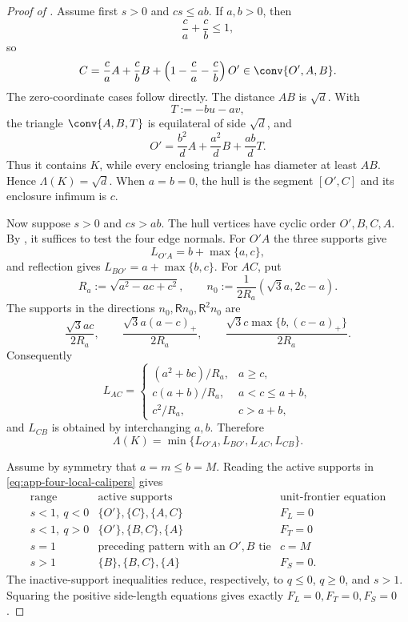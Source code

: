 \begin{proof}[Proof of ]
Assume first $s>0$ and $cs\le ab$.  If $a,b>0$, then
\[
 \frac ca+\frac cb\le1,
\]
so
\[
 C=\frac caA+\frac cbB+\left(1-\frac ca-\frac cb\right)O'
 \in\conv\{O',A,B\}.
\]
The zero-coordinate cases follow directly.  The distance $AB$ is $\sqrt d$.
With
\[
 T:=-bu-av,
\]
the triangle $\conv\{A,B,T\}$ is equilateral of side $\sqrt d$, and
\[
 O'=\frac{b^2}{d}A+\frac{a^2}{d}B+\frac{ab}{d}T.
\]
Thus it contains $K$, while every enclosing triangle has diameter at least
$AB$.  Hence $\Lambda(K)=\sqrt d$.  When $a=b=0$, the hull is the segment
$[O',C]$ and its enclosure infimum is $c$.

Now suppose $s>0$ and $cs>ab$.  The hull vertices have cyclic order
$O',B,C,A$.  By , it suffices to test
the four edge normals.  For $O'A$ the three supports give
\[
 L_{O'A}=b+\max\{a,c\},
\]
and reflection gives $L_{BO'}=a+\max\{b,c\}$.  For $AC$, put
\[
 R_a:=\sqrt{a^2-ac+c^2},
 \qquad
 n_0:=\frac1{2R_a}(\sqrt3a,2c-a).
\]
The supports in the directions $n_0,\mathsf Rn_0,\mathsf R^2n_0$ are
\[
 \frac{\sqrt3ac}{2R_a},
 \qquad
 \frac{\sqrt3a(a-c)_+}{2R_a},
 \qquad
 \frac{\sqrt3c\max\{b,(c-a)_+\}}{2R_a}.
\]
Consequently
\[
 L_{AC}=
 \begin{cases}
 (a^2+bc)/R_a,&a\ge c,\\
 c(a+b)/R_a,&a<c\le a+b,\\
 c^2/R_a,&c>a+b,
 \end{cases}
\]
and $L_{CB}$ is obtained by interchanging $a,b$.  Therefore
\begin{equation}
 \Lambda(K)=\min\{L_{O'A},L_{BO'},L_{AC},L_{CB}\}.
 \label{eq:app-four-local-calipers}
\end{equation}

Assume by symmetry that $a=m\le b=M$.  Reading the active supports in
\eqref{eq:app-four-local-calipers} gives
\[
\begin{array}{c|c|c}
\text{range}&\text{active supports}&\text{unit-frontier equation}\\ \hline
s<1,\ q<0&\{O'\},\{C\},\{A,C\}&F_L=0\\
s<1,\ q>0&\{O'\},\{B,C\},\{A\}&F_T=0\\
s=1&\text{preceding pattern with an $O',B$ tie}&c=M\\
s>1&\{B\},\{B,C\},\{A\}&F_S=0.
\end{array}
\]
The inactive-support inequalities reduce, respectively, to $q\le0$,
$q\ge0$, and $s>1$.  Squaring the positive side-length equations gives
exactly $F_L=0,F_T=0,F_S=0$.


\end{proof}
